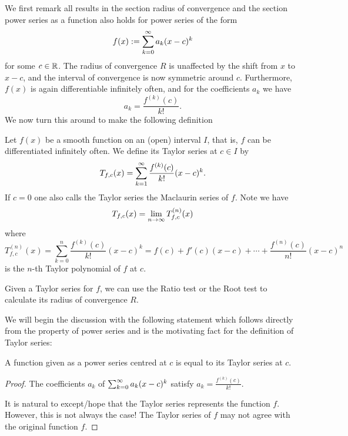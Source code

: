 \documentclass[10pt, a4paper]{article}
\newcommand{\infsumo}{\infsum[k = 0]}
\begin{document}
We first remark all results in the section radius of convergence and the section power series as a function also holds for power series of the form
\[
f(x) := \infsumo a_k(x - c) ^ k
\]
for some $c \in \mathbb{R}$.
The radius of convergence $R$ is unaffected by the shift from $x$ to $x - c$,
and the interval of convergence is now symmetric around $c$.
Furthermore,
$f(x)$ is again differentiable infinitely often,
and for the coefficients $a_k$ we have
\[
a_k = \frac{f ^ {(k)}(c)}{k!}.
\]
We now turn this around to make the following definition

\begin{definition}
    Let $f(x)$ be a smooth function on an
    (open)
    interval $I$,
    that is,
    $f$ can be differentiated infinitely often.
    We define its Taylor series at $c \in I$ by
    \[
    T_{f, c}(x) = \sum_{k = 1}^{\infty}\frac{f ^ {(k)}(c)}{k!}(x - c) ^ k.
    \]
    If $c = 0$ one also calls the Taylor series the Maclaurin series of $f$.
    Note we have
    \[
    T_{f, c}(x) = \lim_{n \rightarrow \infty} T_{f, c} ^ {(n)}(x)
    \]
    where
    \[
    T_{f, c}^{(n)}(x) = \sum_{k = 0}^{n}\frac{f ^ {(k)}(c)}{k!}(x - c) ^ k = f(c) + f'(c)(x - c) + \dotsi + \frac{f ^ {(n)}(c)}{n!}(x - c) ^ n
    \]
    is the $n$-th Taylor polynomial of $f$ at $c$.
\end{definition}

Given a Taylor series for $f$,
we can use the Ratio test or the Root test to calculate its radius of convergence $R$.

We will begin the discussion with the following statement which follows directly from the property of power series and is the motivating fact for the definition of Taylor series:
\begin{proposition}
    A function given as a power series centred at $c$ is equal to its Taylor series at $c$.
    \begin{proof}
        The coefficients $a_k$ of $\infsumo a_k(x - c) ^ k$ satisfy $a_k = \frac{f ^ {(k)}(c)}{k!}$.

        It is natural to except/hope that the Taylor series represents the function $f$.
        However,
        this is not always the case!
        The Taylor series of $f$ may not agree with the original function $f$.
    \end{proof}
\end{proposition}
\end{document}
